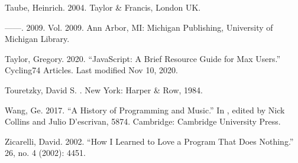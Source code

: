 \documentclass[letterpaper,10pt,english]{sphinxmanual}
\begin{document}
\sphinxAtStartPar
Taube, Heinrich. 2004.  Taylor \& Francis, London UK.

\sphinxAtStartPar
——. 2009.  Vol. 2009. Ann Arbor, MI: Michigan Publishing, University of Michigan Library.

\sphinxAtStartPar
Taylor, Gregory. 2020. “JavaScript: A Brief Resource Guide for Max Users.” Cycling74 Articles. Last modified Nov 10, 2020. 

\sphinxAtStartPar
Touretzky, David S. . New York: Harper \& Row, 1984.

\sphinxAtStartPar
Wang, Ge. 2017. “A History of Programming and Music.” In , edited by Nick Collins and Julio D’escrivan, 58\sphinxhyphen{}74. Cambridge: Cambridge University Press.

\sphinxAtStartPar
Zicarelli, David. 2002. “How I Learned to Love a Program That Does Nothing.”  26, no. 4 (2002): 44\textendash{}51.



\renewcommand{\indexname}{Index}
\printindex
\end{document}
